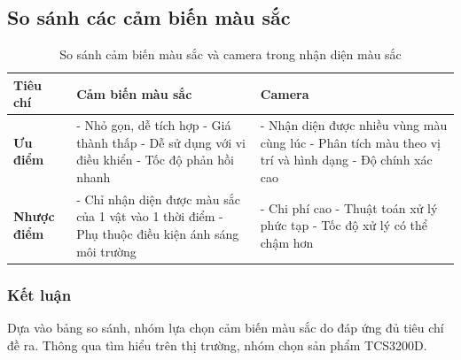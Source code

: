         \subsection{So sánh các cảm biến màu sắc}
            \newpage
            \begin{table}[h!]
                \centering
                \begin{tabular}{|>{\raggedright\arraybackslash}p{4cm}|>{\raggedright\arraybackslash}p{5.5cm}|>{\raggedright\arraybackslash}p{5.5cm}|}
                \hline
                \textbf{Tiêu chí} & \textbf{Cảm biến màu sắc} & \textbf{Camera} \\
                \hline
                \textbf{Ưu điểm} 
                & 
                - Nhỏ gọn, dễ tích hợp \newline
                - Giá thành thấp \newline
                - Dễ sử dụng với vi điều khiển \newline
                - Tốc độ phản hồi nhanh
                &
                - Nhận diện được nhiều vùng màu cùng lúc \newline
                - Phân tích màu theo vị trí và hình dạng \newline
                - Độ chính xác cao \newline
                \\
                \hline
                \textbf{Nhược điểm} 
                & 
                - Chỉ nhận diện được màu sắc của 1 vật vào 1 thời điểm \newline
                - Phụ thuộc điều kiện ánh sáng môi trường \newline
                &
                - Chi phí cao \newline
                - Thuật toán xử lý phức tạp \newline
                - Tốc độ xử lý có thể chậm hơn
                \\
                \hline
                \end{tabular}
                \caption{So sánh cảm biến màu sắc và camera trong nhận diện màu sắc}
            \end{table}
        \subsubsection{Kết luận}
            \hspace*{0.6cm}Dựa vào bảng so sánh, nhóm lựa chọn cảm biến màu sắc do đáp ứng đủ tiêu chí đề ra. Thông qua tìm hiểu trên thị trường, nhóm chọn sản phẩm TCS3200D. 
